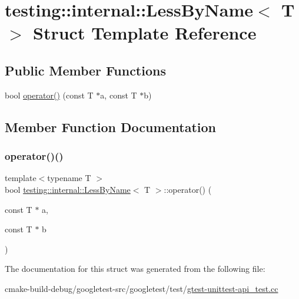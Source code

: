 \hypertarget{structtesting_1_1internal_1_1LessByName}{}\section{testing\+::internal\+::Less\+By\+Name$<$ T $>$ Struct Template Reference}
\label{structtesting_1_1internal_1_1LessByName}
\subsection*{Public Member Functions}
\begin{DoxyCompactItemize}
\item 
bool \mbox{\hyperlink{structtesting_1_1internal_1_1LessByName_a62386ac7750bfc035536be55d90a52eb}{operator()}} (const T $\ast$a, const T $\ast$b)
\end{DoxyCompactItemize}


\subsection{Member Function Documentation}
\mbox{\label{structtesting_1_1internal_1_1LessByName_a62386ac7750bfc035536be55d90a52eb}} 
\subsubsection{\texorpdfstring{operator()()}{operator()()}}
{\footnotesize\ttfamily template$<$typename T $>$ \\
bool \mbox{\hyperlink{structtesting_1_1internal_1_1LessByName}{testing\+::internal\+::\+Less\+By\+Name}}$<$ T $>$\+::operator() (\begin{DoxyParamCaption}\item[{const T $\ast$}]{a,  }\item[{const T $\ast$}]{b }\end{DoxyParamCaption})\hspace{0.3cm}{\ttfamily [inline]}}



The documentation for this struct was generated from the following file\+:\begin{DoxyCompactItemize}
\item 
cmake-\/build-\/debug/googletest-\/src/googletest/test/\mbox{\hyperlink{gtest-unittest-api__test_8cc}{gtest-\/unittest-\/api\+\_\+test.\+cc}}\end{DoxyCompactItemize}

